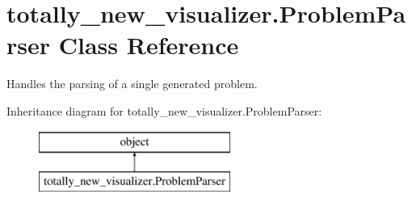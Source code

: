 \hypertarget{classtotally__new__visualizer_1_1_problem_parser}{}\section{totally\+\_\+new\+\_\+visualizer.\+Problem\+Parser Class Reference}
\label{classtotally__new__visualizer_1_1_problem_parser}


Handles the parsing of a single generated problem.  


Inheritance diagram for totally\+\_\+new\+\_\+visualizer.\+Problem\+Parser\+:\begin{figure}[H]
\begin{center}
\leavevmode
\includegraphics[height=2.000000cm]{classtotally__new__visualizer_1_1_problem_parser}
\end{center}
\end{figure}
